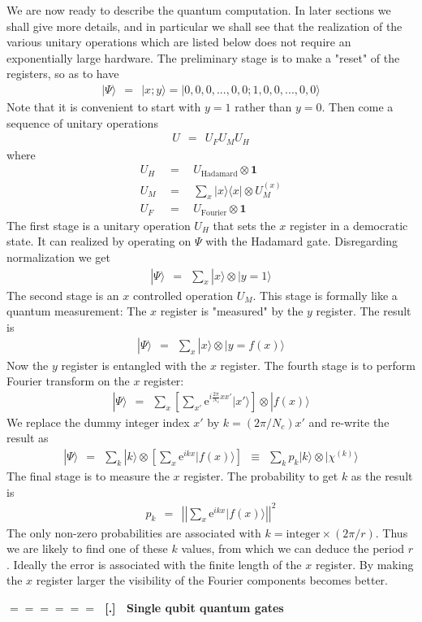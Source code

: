\documentclass[onecolumn,fleqn]{revtex4}
\newcommand{\eexp}{\mathrm{e}^}
\newcommand{\tbox}[1]{\text{#1}}
\newcommand{\beq}{\begin{eqnarray}}
\newcommand{\eeq}{\end{eqnarray}}
\renewcommand{\thesubsection}{\arabic{subsection}}
\renewcommand{\thesubsubsection}{\arabic{subsubsection}}
\newcommand{\sheadC}[1]
{
\addtocounter{subsubsection}{1}
\vspace{5mm}
{\Large\bf $=\!=\!=\!=\!=\!=\;$ [\thesubsection.\thesubsubsection] \ #1}  
\nopagebreak
\phantomsection
}
\begin{document}
We are now ready to describe the quantum computation.
In later sections we shall give more details, 
and in particular we shall see that the realization 
of the various unitary operations which are 
listed below does not require an exponentially 
large hardware.   
The preliminary stage is to make a "reset" 
of the registers, so as to have 
\beq
|\Psi \rangle \ \ = \ \ |x ; y\rangle = | 0,0,0,...,0,0 ; 1,0,0,...,0,0 \rangle
\eeq
Note that it is convenient to start with $y=1$ rather than $y=0$. 
Then come a sequence of unitary operations 
\beq
U \ \ = \ \ U_F U_M U_H
\eeq
where
\beq
U_H \ \ &=& \ \ U_{\tbox{Hadamard}} \otimes \bm{1} \\
U_M \ \ &=& \ \ \sum_x |x\rangle\langle x| \otimes  U_M^{(x)} \\
U_F \ \ &=& \ \ U_{\tbox{Fourier}} \otimes \bm{1}
\eeq
The first stage is a unitary operation $U_H$ that 
sets the $x$ register in a democratic state.
It can realized by operating on $\Psi$ with 
the Hadamard gate. Disregarding normalization we get   
\beq
|\Psi \rangle \ \ = \ \ \sum_x |x \rangle \otimes   | y{=}1 \rangle 
\eeq
The second stage is an $x$ controlled operation $U_M$.
This stage is formally like a quantum measurement: 
The $x$ register is "measured" by the $y$ register.  
The result is 
\beq
|\Psi \rangle \ \ = \ \ \sum_x |x \rangle \otimes  | y{=}f(x) \rangle 
\eeq
Now the $y$ register is entangled with the $x$ register. 
The fourth stage is to perform Fourier transform 
on the $x$ register:
\beq
|\Psi \rangle \ \ = \ \ \sum_x 
\left[ \sum_{x'}  \eexp{i\frac{2\pi}{N_c}xx'} |x' \rangle \right] 
\otimes   | f(x) \rangle 
\eeq
We replace the dummy integer index $x'$ by $k=(2\pi/N_c)x'$ 
and re-write the result as  
\beq
|\Psi \rangle \ \ = \ \ \sum_k   |k \rangle  \otimes   
\left[ \sum_x  \eexp{ikx} |f(x) \rangle \right] 
\ \ \equiv \ \ 
\sum_k p_k |k\rangle \otimes |\chi^{(k)}\rangle
\eeq
The final stage is to measure the $x$ register. 
The probability to get $k$ as the result is 
\beq  
p_k \ \ = \ \ 
\left|\left|
\sum_x  \eexp{ikx} |f(x) \rangle
\right|\right|^2 
\eeq
The only non-zero probabilities are associated 
with $k=\mbox{integer} \times (2\pi/r)$.
Thus we are likely to find one of these $k$ values, 
from which we can deduce the period $r$. 
Ideally the error is associated with the 
finite length of the $x$ register. By making 
the $x$ register larger the visibility of the Fourier 
components becomes better.  





\sheadC{Single qubit quantum gates}
\end{document}
